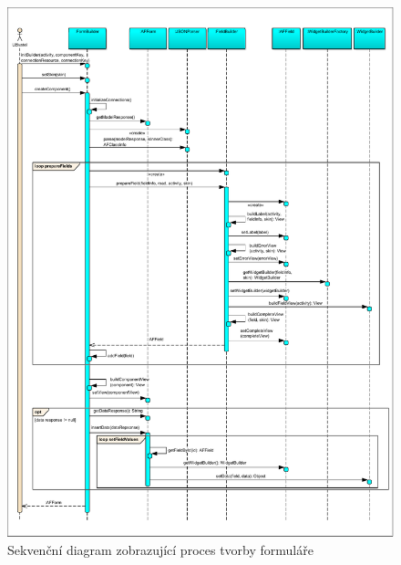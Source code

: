 \begin{figure}
\begin{center}
\includegraphics[width=\textwidth, height=\textheight, keepaspectratio, trim=4 4 4 4, clip]{figures/sequence}
\caption{Sekvenční diagram zobrazující proces tvorby formuláře}
\label{img:sdFormBuilding}
\end{center}
\end{figure}

